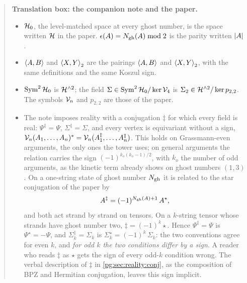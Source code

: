 \begin{quote}
  \small
  \textbf{Translation box: the companion note and the paper.}

  \begin{itemize}
    \setlength{\itemsep}{0.5ex}

    \item $\mc H_0$, the level-matched space at every ghost number, is the space written $\Hs$ in the paper.
      $\epsilon(A) = N_{\rm gh}(A) \bmod 2$ is the parity written $\abs{A}$.

    \item $\braket{A, B}$ and $\braket{X, Y}_2$ are the pairings $\pair{A}{B}$ and $\pair[2]{X}{Y}$, with the same definitions and the same Koszul sign.

    \item $\Sym^2 \mc H_0$ is $\Hn{2}$; the field $\Sigma \in \Sym^2 \mc H_0 / \ker \mc V_4$ is $\Sigma_2 \in \Hn{2} / \ker \sprod{2}{2}$.
      The symbols $\mc V_n$ and $p_{2,2}$ are those of the paper.

    \item The note imposes reality with a conjugation $\ddagger$ for which every field is real: $\Psi^\ddagger = \Psi$, $\Sigma^\ddagger = \Sigma$, and every vertex is equivariant without a sign, $\mc V_n(A_1, \ldots, A_n)^* = \mc V_n(A_1^\ddagger, \ldots, A_n^\ddagger)$.
      This holds on Grassmann-even arguments, the only ones the tower uses; on general arguments the relation carries the sign $(-1)^{k_o (k_o - 1) / 2}$, with $k_o$ the number of odd arguments, as the kinetic term already shows on ghost numbers $(1, 3)$.
      On a one-string state of ghost number $N_{\rm gh}$ it is related to the star conjugation of the paper by
      \begin{equation*}
        A^\ddagger
          = (-1)^{N_{\rm gh}(A) + 1} \, A^\star,
      \end{equation*}
      and both act strand by strand on tensors.
      On a $k$-string tensor whose strands have ghost number two, $\ddagger = (-1)^k \star$.
      Hence $\Psi^\ddagger = \Psi$ is $\Psi^\star = - \Psi$, and $\Sigma_k^\ddagger = \Sigma_k$ is $\Sigma_k^\star = (-1)^k \, \Sigma_k$: the two conventions agree for even $k$, and \emph{for odd $k$ the two conditions differ by a sign}.
      A reader who reads $\ddagger$ as $\star$ gets the sign of every odd-$k$ condition wrong.
      The verbal description of $\ddagger$ in \cref{pg:sec:reality:conj}, as the composition of BPZ and Hermitian conjugation, leaves this sign implicit.


\end{itemize}
\end{quote}

